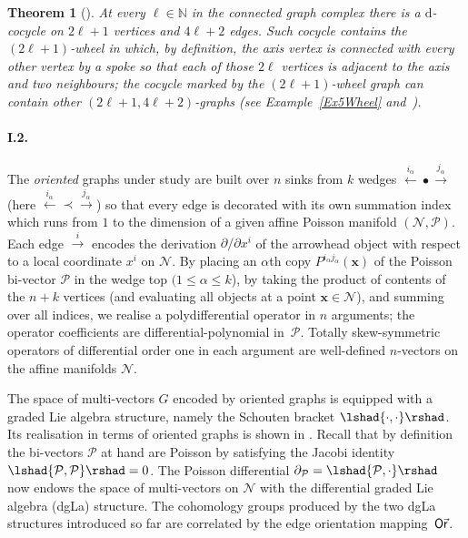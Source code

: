 \documentclass[a4paper]{jpconf}%
\newtheorem{theor}{Theorem}%
\theoremstyle{definition}
\theoremstyle{remark}
\newcommand{\cN}{\mathcal{N}}
\newcommand{\cP}{\mathcal{P}}\newcommand{\cR}{\mathcal{R}}
\newcommand{\bx}{{\boldsymbol{x}}}
\newcommand{\Id}{{\mathrm d}}
\newcommand{\schouten}[1]{\lshad {#1} \rshad}
\def\oldvec{\mathaccent "017E\relax } %
\DeclareMathOperator{\Ori}{\mathsf{O\oldvec{r}}}
\begin{document}
\begin{theor}[{{\cite[Th.]{DolgushevRogersWillwacher}}}]\label{ThWheelCocycles}
At every $\ell \in \mathbb{N}$ in the connected graph complex there is a $\Id$-cocycle on $2\ell + 1$ vertices and $4\ell+2$ edges.
Such cocycle contains the $(2\ell+1)$-wheel in which, by definition, the axis vertex is connected with every other vertex by a spoke so that each of those $2\ell$ vertices is adjacent to the axis and two neighbours\textup{;} the cocycle marked by the $(2\ell+1)$-wheel graph can contain other $(2\ell+1, 4\ell+2)$-\/graphs \textup{(}see Example~\textup{\ref{Ex5Wheel}} and~\textup{\cite{JNMP2017})}.
\end{theor}

\paragraph{\textbf{\textup{I.2.}}} %
The \emph{oriented} graphs under study are built over $n$ sinks from $k$ wedges $\xleftarrow{i_\alpha} \bullet \xrightarrow{j_\alpha}$ (here $\xleftarrow{i_\alpha} \prec \xrightarrow{j_\alpha}$) so that every edge is decorated with its own summation index which runs from $1$ to the dimension of a given affine Poisson manifold $(\cN, \cP)$.
Each edge $\xrightarrow{i}$ encodes the derivation $\partial/\partial x^i$ of the arrowhead object with respect to a local coordinate $x^i$ on $\cN$.
By placing an $\alpha$th copy $P^{i_\alpha j_\alpha}(\bx)$ of the Poisson bi-vector $\cP$ in the wedge top $(1 \leqslant \alpha \leqslant k$), by taking the product of contents of the $n+k$ vertices (and evaluating all objects at a point $\bx \in \cN$), and summing over all indices, we realise a polydifferential operator in $n$ arguments; the operator coefficients are differential-polynomial in~$\cP$.
Totally skew-symmetric operators of differential order one in each argument are well-defined $n$-vectors on the affine manifolds $\cN$.

The space of multi\/-\/vectors $G$ encoded by oriented graphs is equipped with a graded Lie algebra structure, namely the Schouten bracket $\schouten{\cdot,\cdot}$.
Its realisation in terms of oriented graphs is shown in \cite[Remark 4]{f16}.
Recall that by definition the bi-vectors $\cP$ at hand are Poisson by satisfying the Jacobi identity $\schouten{\cP, \cP} = 0$.
The Poisson differential $\partial_\cP = \schouten{\cP, \cdot}$ now endows the space of multi-vectors on $\cN$ with the differential graded Lie algebra (dgLa) structure.
The cohomology groups produced by the two dgLa structures introduced %
so far are correlated %
by the edge orientation mapping~$\Ori$.
\end{document}
